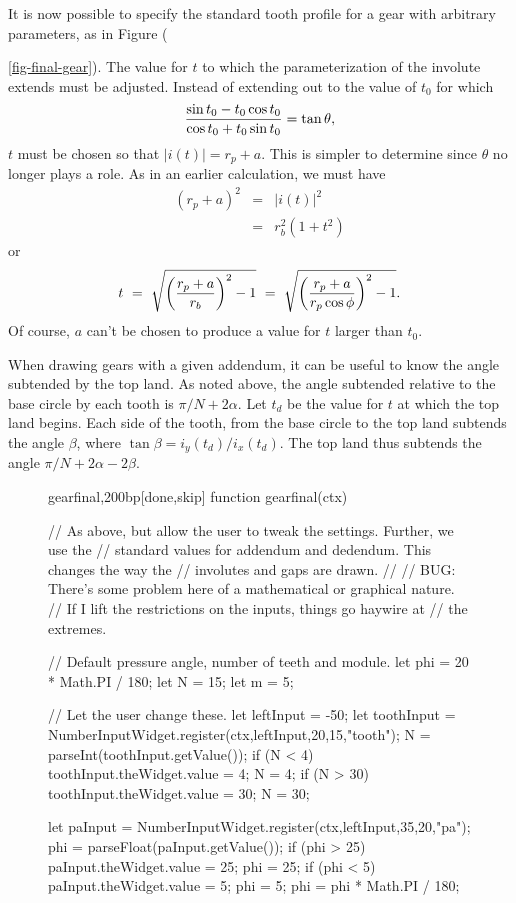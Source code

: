 \documentclass[10pt]{article}
\begin{document}
It is now possible to specify the standard tooth profile for a gear
with arbitrary parameters, as in Figure ({\ref{fig-final-gear}). The
value for $t$ to which the parameterization of the involute extends
must be adjusted. Instead of extending out to the value of $t_0$ for
which 
$${\sin t_0 - t_0\cos t_0\over \cos t_0 + t_0\sin t_0} = \tan\theta,$$
$t$ must be chosen so that $|i(t)| = r_p + a$. This is simpler to
determine since $\theta$ no longer plays a role. As in an earlier
calculation, we must have
\begin{eqnarray*}
(r_p+a)^2 &=& |i(t)|^2 \\
&=& r_b^2(1+t^2)
\end{eqnarray*}
or
$$t\ =\ \sqrt{\left({r_p+a\over r_b}\right)^2 - 1}\ =\ 
\sqrt{\left({r_p+a\over r_p\cos\phi}\right)^2 - 1}.$$
Of course, $a$ can't be chosen to produce a value for $t$ larger than $t_0$.

When drawing gears with a given addendum, it can be useful to know the
angle subtended by the top land. As noted above, the angle subtended
relative to the base circle by each tooth is $\pi/N + 2\alpha$. Let
$t_d$ be the value for $t$ at which the top land begins. Each
side of the tooth, from the base circle to the top land subtends the
angle $\beta$, where $\tan\beta = i_y(t_d)/i_x(t_d)$. The top land
thus subtends the angle $\pi/N + 2\alpha - 2\beta$.

\begin{figure}
\begin{figput}{gearfinal,200bp}[done,skip]
function gearfinal(ctx) {

  // As above, but allow the user to tweak the settings. Further, we use the
  // standard values for addendum and dedendum. This changes the way the
  // involutes and gaps are drawn.
  //
  // BUG: There's some problem here of a mathematical or graphical nature.
  // If I lift the restrictions on the inputs, things go haywire at
  // the extremes.
  
  // Default pressure angle, number of teeth and module.
  let phi = 20 * Math.PI / 180;
  let N = 15;
  let m = 5;

  // Let the user change these.
  let leftInput = -50;
  let toothInput = NumberInputWidget.register(ctx,leftInput,20,15,"tooth");
  N = parseInt(toothInput.getValue());
  if (N < 4)
    {
      toothInput.theWidget.value = 4;
      N = 4;
    }
  if (N > 30)
    {
      toothInput.theWidget.value = 30;
      N = 30;
    }
    
  let paInput = NumberInputWidget.register(ctx,leftInput,35,20,"pa");
  phi = parseFloat(paInput.getValue());
  if (phi > 25)
    {
      paInput.theWidget.value = 25;
      phi = 25;
    }      
  if (phi < 5)
    {
      paInput.theWidget.value = 5;
      phi = 5;
    }
  phi = phi * Math.PI / 180;

}
\end{figput}
\end{figure}}
\end{document}
